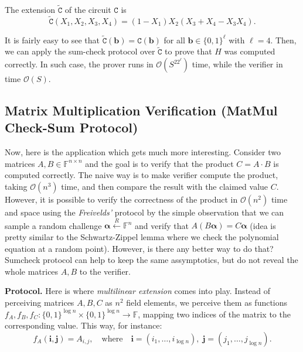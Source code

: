 \documentclass{gkr-template}
\begin{document}
The extension $\widetilde{\mathtt{C}}$ of the circuit $\mathtt{C}$ is
\begin{equation*}
    \widetilde{\mathtt{C}}(X_1,X_2,X_3,X_4) = (1 - X_1)X_2(X_3 + X_4 - X_3X_4).
\end{equation*}

It is fairly easy to see that $\widetilde{\mathtt{C}}(\boldsymbol{b}) =
\mathtt{C}(\boldsymbol{b})$ for all $\boldsymbol{b} \in \{0,1\}^{\ell}$ with
$\ell=4$. Then, we can apply the sum-check protocol over
$\widetilde{\mathtt{C}}$ to prove that $H$ was computed correctly. In such case,
the prover runs in $\mathcal{O}(S^22^{\ell})$ time, while the verifier in time
$\mathcal{O}(S)$. 

\subsection*{Matrix Multiplication Verification (MatMul Check-Sum Protocol)}

Now, here is the application which gets much more interesting. Consider two
matrices $A, B \in \mathbb{F}^{n \times n}$ and the goal is to verify that the
product $C = A \cdot B$ is computed correctly. The naive way is to make verifier
compute the product, taking $\mathcal{O}(n^3)$ time, and then compare the result
with the claimed value $C$. However, it is possible to verify the correctness of
the product in $\mathcal{O}(n^2)$ time and space using the \textit{Freivelds'}
protocol by the simple observation that we can sample a random challenge
$\boldsymbol{\alpha} \xleftarrow{R} \mathbb{F}^n$ and verify that
$A(B\boldsymbol{\alpha}) = C\boldsymbol{\alpha}$ (idea is pretty similar
to the Schwartz-Zippel lemma where we check the polynomial equation at a 
random point). However, is there any better way to do that? Sumcheck 
protocol can help to keep the same assymptotics, but do not reveal 
the whole matrices $A,B$ to the verifier.

\textbf{Protocol.} Here is where \textit{multilinear extension} comes into play.
Instead of perceiving matrices $A,B,C$ as $n^2$ field elements, we perceive 
them as functions $f_A, f_B, f_C: \{0,1\}^{\log n} \times \{0,1\}^{\log n} \to \mathbb{F}$,
mapping two indices of the matrix to the corresponding value. This way, for instance:
\begin{equation*}
    f_A(\boldsymbol{i}, \boldsymbol{j}) = A_{i,j}, \quad \text{where} \quad \boldsymbol{i}=(i_1,\dots,i_{\log n}), \; \boldsymbol{j}=(j_1,\dots,j_{\log n}).
\end{equation*}
\end{document}
